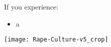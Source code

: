 \documentclass[a4paper,english,12pt]{article}
\begin{document}
\begin{figure*}[!b]
  \centering
  \begin{minipage}{.5\textwidth}
    If you experience:
    \begin{itemize}
    \item a
      \end{itemize}
  \end{minipage}
  \begin{minipage}{.4\textwidth}
    \texttt{[image: Rape-Culture-v5\_crop]}
  \end{minipage}
\end{figure*}










\end{document}
